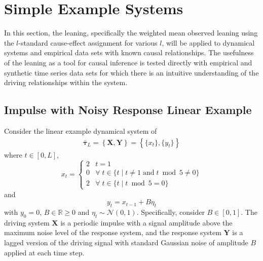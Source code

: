 \documentclass[a4paper,11pt,twocolumn]{article}
\begin{document}
\section{Simple Example Systems}
In this section, the leaning, specifically the weighted mean observed leaning using the $l$-standard cause-effect assignment for various $l$, will be applied to dynamical systems and empirical data sets with known causal relationships.  The usefulness of the leaning as a tool for causal inference is tested directly with empirical and synthetic time series data sets for which there is an intuitive understanding of the driving relationships within the system.

\subsection{Impulse with Noisy Response Linear Example}
\label{sec:IR}
Consider the linear example dynamical system of
\begin{eqnarray}
\label{eqn:IReqn}
\bar{\mathbf{\tau}}_L = \left\{\mathbf{X},\mathbf{Y}\right\} = \left\{\{x_t\},\{y_t\}\right\}
\end{eqnarray}
where $t\in[0,L]$,
\begin{equation*}
x_t = \left\{
  \begin{array}{lr}
    2 & t = 1\\
    0 & \forall\; t\in\{t\;|\;t\neq 1 \;\mathrm{and}\; t\bmod 5 \neq 0\}\\
    2 & \forall\; t\in\{t\;|\;t\bmod 5 = 0\}
  \end{array}
\right.
\end{equation*}
and
\begin{equation*}
y_t = x_{t-1} + B\eta_t
\end{equation*}
with $y_0 = 0$, $B\in\mathbb{R}\ge 0$ and $\eta_t\sim\mathcal{N}\left(0,1\right)$.  Specifically, consider $B\in[0,1]$.  The driving system $\mathbf{X}$ is a periodic impulse with a signal amplitude above the maximum noise level of the response system, and the response system $\mathbf{Y}$ is a lagged version of the driving signal with standard Gaussian noise of amplitude $B$ applied at each time step.  
\end{document}

